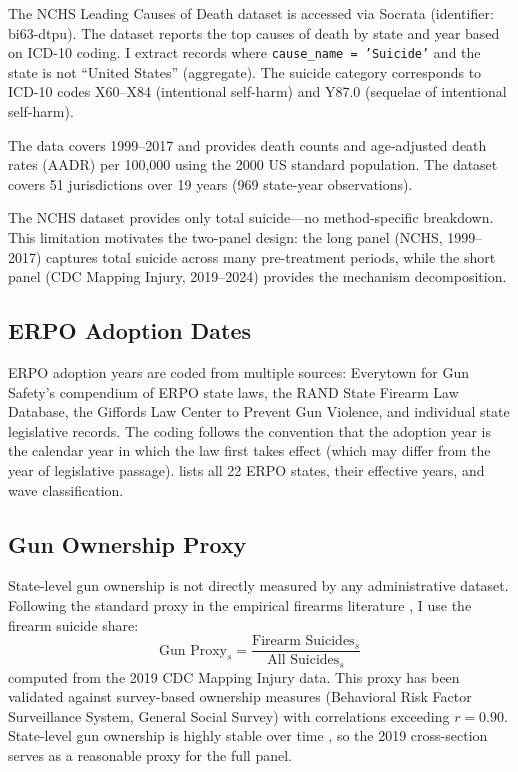 \documentclass[12pt]{article}
\begin{document}
The NCHS Leading Causes of Death dataset is accessed via Socrata (identifier: bi63-dtpu). The dataset reports the top causes of death by state and year based on ICD-10 coding. I extract records where \texttt{cause\_name = 'Suicide'} and the state is not ``United States'' (aggregate). The suicide category corresponds to ICD-10 codes X60--X84 (intentional self-harm) and Y87.0 (sequelae of intentional self-harm).

The data covers 1999--2017 and provides death counts and age-adjusted death rates (AADR) per 100,000 using the 2000 US standard population. The dataset covers 51 jurisdictions over 19 years (969 state-year observations).

The NCHS dataset provides only total suicide---no method-specific breakdown. This limitation motivates the two-panel design: the long panel (NCHS, 1999--2017) captures total suicide across many pre-treatment periods, while the short panel (CDC Mapping Injury, 2019--2024) provides the mechanism decomposition.

\subsection{ERPO Adoption Dates}

ERPO adoption years are coded from multiple sources: Everytown for Gun Safety's compendium of ERPO state laws, the RAND State Firearm Law Database, the Giffords Law Center to Prevent Gun Violence, and individual state legislative records. The coding follows the convention that the adoption year is the calendar year in which the law first takes effect (which may differ from the year of legislative passage).  lists all 22 ERPO states, their effective years, and wave classification.



\subsection{Gun Ownership Proxy}

State-level gun ownership is not directly measured by any administrative dataset. Following the standard proxy in the empirical firearms literature \citep{kleck2004measures, azrael2004state}, I use the firearm suicide share:
\begin{equation}
\text{Gun Proxy}_s = \frac{\text{Firearm Suicides}_s}{\text{All Suicides}_s}
\end{equation}
computed from the 2019 CDC Mapping Injury data. This proxy has been validated against survey-based ownership measures (Behavioral Risk Factor Surveillance System, General Social Survey) with correlations exceeding $r = 0.90$. State-level gun ownership is highly stable over time \citep{cook2006life}, so the 2019 cross-section serves as a reasonable proxy for the full panel.
\end{document}
